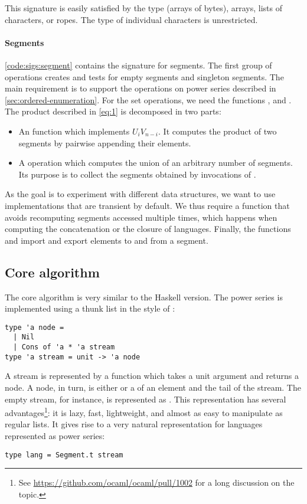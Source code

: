 This signature is easily satisfied by the \ocaml {}
type (\ie arrays of bytes), arrays, lists of characters, or ropes. The
type of individual characters is unrestricted.

\paragraph{Segments}

\autoref{code:sigs:segment} contains the signature for segments.
The first group of operations creates and tests for empty segments and
singleton segments. 
The main requirement is to support the operations on power series described in
\autoref{sec:ordered-enumeration}.
For the set operations, we need the functions
,  and .
%
The product described in \autoref{eq:1} is decomposed in two parts:
\begin{itemize}
\item An  function which implements $U_i V_{n-i}$. It computes the
  product of two segments by pairwise appending their elements.
\item A  operation which computes the union of an arbitrary number
  of segments. Its purpose is to collect the segments obtained
  by invocations of .
\end{itemize}
%
As the goal is to experiment with different data structures, we want
to use implementations that are transient by default. We thus require 
a function  that avoids recomputing segments accessed
multiple times, which happens when computing the concatenation or the closure of languages. 
%
Finally, the functions   and  import and
export elements to and from a segment.

\subsection{Core algorithm}

The core algorithm is very similar to the Haskell version. The power series
is implemented using a thunk list in the style of \citet{DBLP:conf/cpp/Pottier17}:

\begin{lstlisting}
type 'a node =
  | Nil
  | Cons of 'a * 'a stream
type 'a stream = unit -> 'a node
\end{lstlisting}

A stream is represented by a function which takes a unit argument and returns
a node. A node, in turn, is either  or a  of an
element and the tail of the stream. The empty stream, for instance, is
represented as .
This representation has several advantages\footnote{See
  \url{https://github.com/ocaml/ocaml/pull/1002} for a long discussion
  on the topic.}: it is lazy, fast, lightweight, and almost as easy to
manipulate as regular lists. 
It gives rise to a very natural representation for languages represented as power series:
\begin{lstlisting}[numbers=none]
type lang = Segment.t stream
\end{lstlisting}

